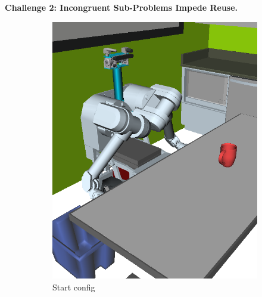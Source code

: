 \textbf{Challenge 2: Incongruent Sub-Problems Impede Reuse.}

{
\setlength{\offsetpage}{0.75in}
\begin{figure}[t]
\begin{widepage}
\begin{center}

\begin{subfigure}[t]{0.19\linewidth}
\centering
\includegraphics[width=\columnwidth]{figs/testherb-a.png}
\caption{Start config}
\end{subfigure}
\begin{subfigure}[t]{0.19\linewidth}
\centering

\end{subfigure}
\end{center}
\end{widepage}
\end{figure}}
